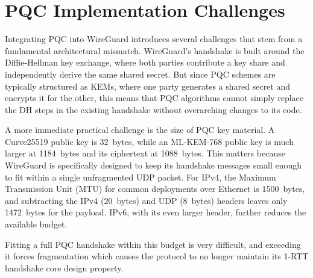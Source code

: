 \section{PQC Implementation Challenges} \label{wg-PQC}
Integrating PQC into WireGuard introduces several challenges that stem from a fundamental architectural mismatch. WireGuard's handshake is built around the Diffie-Hellman key exchange, where both parties contribute a key share and independently derive the same shared secret. But since PQC schemes are typically structured as KEMs, where one party generates a shared secret and encrypts it for the other, this means that PQC algorithms cannot simply replace the DH steps in the existing handshake without overarching changes to its code. 

A more immediate practical challenge is the size of PQC key material. A Curve25519 public key is \qty{32}{bytes}, while an ML-KEM-768 public key is much larger at \qty{1184}{bytes} and its ciphertext at \qty{1088}{bytes}. This matters because WireGuard is specifically designed to keep its handshake messages small enough to fit within a single unfragmented UDP packet. For IPv4, the Maximum Transmission Unit (MTU) for common deployments over Ethernet is \qty{1500}{bytes}, and subtracting the IPv4 (\qty{20}{bytes}) and UDP (\qty{8}{bytes}) headers leaves only \qty{1472}{bytes} for the payload. IPv6, with its even larger header, further reduces the available budget.

Fitting a full PQC handshake within this budget is very difficult, and exceeding it forces fragmentation which causes the protocol to no longer maintain its 1-RTT handshake core design property.